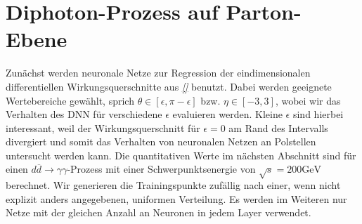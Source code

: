 \section{Diphoton-Prozess auf Parton-Ebene}
Zunächst werden neuronale Netze zur Regression der eindimensionalen differentiellen Wirkungsquerschnitte aus \textit{\autoref{}} benutzt. Dabei werden geeignete Wertebereiche gewählt, sprich $\theta \in [\epsilon, \pi - \epsilon]$ bzw. $\eta \in [-3, 3]$, wobei wir das Verhalten des DNN für verschiedene $\epsilon$ evaluieren werden. Kleine $\epsilon$ sind hierbei interessant, weil der Wirkungsquerschnitt für $\epsilon = 0$ am Rand des Intervalls divergiert und somit das Verhalten von neuronalen Netzen an Polstellen untersucht werden kann. Die quantitativen Werte im nächsten Abschnitt sind für einen $d\overline{d} \rightarrow \gamma \gamma$-Prozess mit einer Schwerpunktsenergie von $\sqrt{s} = 200 \text{GeV}$ berechnet. Wir generieren die Trainingspunkte zufällig nach einer, wenn nicht explizit anders angegebenen, uniformen Verteilung.  
Es werden im Weiteren nur Netze mit der gleichen Anzahl an Neuronen in jedem Layer verwendet.


